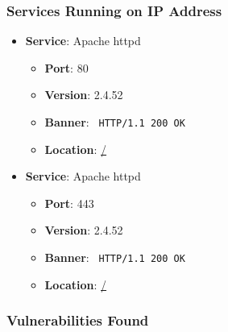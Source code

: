 \documentclass{article}
\begin{document}
\subsubsection*{Services Running on IP Address}

\begin{itemize}
    
        \item \textbf{Service}: Apache httpd
        \begin{itemize}
            \item \textbf{Port}: 80
            \item \textbf{Version}:  2.4.52 
            \item \textbf{Banner}: \texttt{
                HTTP/1.1 200 OK
            }
            \item \textbf{Location}: \href{ / }{ / }
        \end{itemize}
    
        \item \textbf{Service}: Apache httpd
        \begin{itemize}
            \item \textbf{Port}: 443
            \item \textbf{Version}:  2.4.52 
            \item \textbf{Banner}: \texttt{
                HTTP/1.1 200 OK
            }
            \item \textbf{Location}: \href{ / }{ / }
        \end{itemize}
    
\end{itemize}


\subsubsection*{Vulnerabilities Found}
\end{document}
